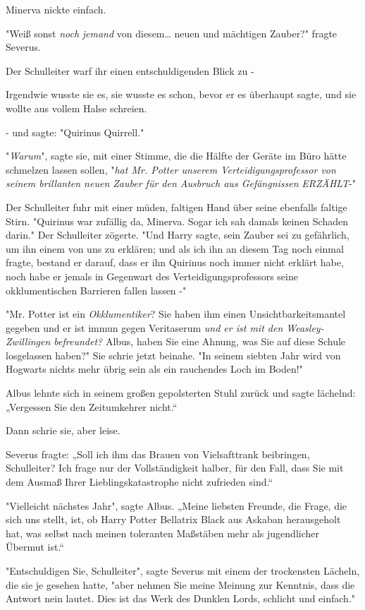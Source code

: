 {Minerva nickte einfach.

"Weiß sonst \emph{noch} \emph{jemand} von diesem… neuen und mächtigen Zauber?" fragte Severus.

Der Schulleiter warf ihr einen entschuldigenden Blick zu -

Irgendwie wusste sie es, sie wusste es schon, bevor er es überhaupt sagte, und sie wollte aus vollem Halse schreien.

- und sagte: "Quirinus Quirrell."

"\emph{Warum}", sagte sie, mit einer Stimme, die die Hälfte der Geräte im Büro hätte schmelzen lassen sollen, "\emph{hat Mr. Potter unserem Verteidigungsprofessor von seinem brillanten neuen Zauber für den Ausbruch aus Gefängnissen} \emph{ERZÄHLT}-"

Der Schulleiter fuhr mit einer müden, faltigen Hand über seine ebenfalls faltige Stirn. "Quirinus war zufällig da, Minerva. Sogar ich sah damals keinen Schaden darin." Der Schulleiter zögerte. "Und Harry sagte, sein Zauber sei zu gefährlich, um ihn einem von uns zu erklären; und als ich ihn an diesem Tag noch einmal fragte, bestand er darauf, dass er ihn Quirinus noch immer nicht erklärt habe, noch habe er jemals in Gegenwart des Verteidigungsprofessors seine okklumentischen Barrieren fallen lassen -"

"Mr. Potter ist ein \emph{Okklumentiker}? Sie haben ihm einen Unsichtbarkeitsmantel gegeben und er ist immun gegen Veritaserum \emph{und er ist mit den Weasley-Zwillingen befreundet?} Albus, haben Sie eine Ahnung, was Sie auf diese Schule losgelassen haben?" Sie schrie jetzt beinahe. "In seinem siebten Jahr wird von Hogwarts nichts mehr übrig sein als ein rauchendes Loch im Boden!"

Albus lehnte sich in seinem großen gepolsterten Stuhl zurück und sagte lächelnd: „Vergessen Sie den Zeitumkehrer nicht.“

Dann schrie sie, aber leise.

Severus fragte: „Soll ich ihm das Brauen von Vielsafttrank beibringen, Schulleiter? Ich frage nur der Vollständigkeit halber, für den Fall, dass Sie mit dem Ausmaß Ihrer Lieblingskatastrophe nicht zufrieden sind.“

"Vielleicht nächstes Jahr", sagte Albus. „Meine liebsten Freunde, die Frage, die sich uns stellt, ist, ob Harry Potter Bellatrix Black aus Askaban herausgeholt hat, was selbst nach meinen toleranten Maßstäben mehr als jugendlicher Übermut ist.“

"Entschuldigen Sie, Schulleiter", sagte Severus mit einem der trockensten Lächeln, die sie je gesehen hatte, "aber nehmen Sie meine Meinung zur Kenntnis, dass die Antwort nein lautet. Dies ist das Werk des Dunklen Lords, schlicht und einfach."

}
